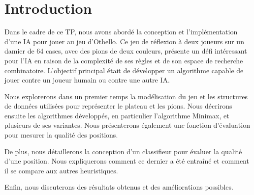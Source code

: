 \chapter{Introduction}
\label{chap:introduction}
Dans le cadre de ce \ac{TP}, nous avons abordé la conception et l'implémentation d'une \ac{IA} pour jouer au jeu d'Othello. Ce jeu de réflexion à deux joueurs sur un damier de 64 cases, avec des pions de deux couleurs, présente un défi intéressant pour l'IA en raison de la complexité de ses règles et de son espace de recherche combinatoire. L'objectif principal était de développer un algorithme capable de jouer contre un joueur humain ou contre une autre IA.

Nous explorerons dans un premier temps la modélisation du jeu et les structures de données utilisées pour représenter le plateau et les pions. Nous décrirons ensuite les algorithmes développés, en particulier l'algorithme Minimax, et plusieurs de ses variantes. Nous présenterons également une fonction d'évaluation pour mesurer la qualité des positions.

De plus, nous détaillerons la conception d'un classifieur pour évaluer la qualité d'une position. Nous expliquerons comment ce dernier a été entraîné et comment il se compare aux autres heuristiques.

Enfin, nous discuterons des résultats obtenus et des améliorations possibles.

